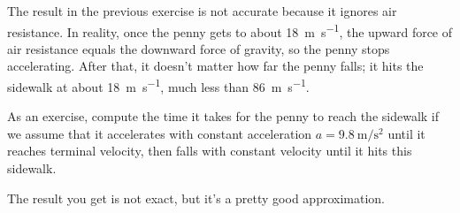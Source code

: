 \begin{ex}
The result in the previous exercise is not accurate because it ignores air resistance.  In reality, once the penny gets to about \SI{18}{\meter\per\second}, the upward force of air resistance equals the downward force of gravity, so the penny stops accelerating.  After that, it doesn't matter how far the penny falls; it hits the sidewalk at about \SI{18}{\meter\per\second}, much less than \SI{86}{\meter\per\second}.

As an exercise, compute the time it takes for the penny to reach the sidewalk if we assume that it accelerates with constant acceleration
$a = \SI{9.8}{\meter\per\second\squared}$ until it reaches terminal velocity, then falls with constant velocity until it hits this sidewalk.

The result you get is not exact, but it's a pretty good approximation.

\end{ex}

